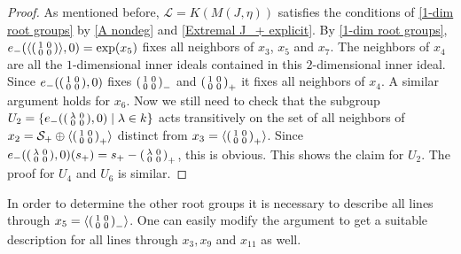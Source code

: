 \documentclass[oneside,a4paper]{amsart} %
\theoremstyle{definition}
\numberwithin{equation}{section}
\begin{document}
\begin{proof}
	As mentioned before, $\mathcal L=K(M(J,\eta))$ satisfies the conditions of \cref{1-dim root groups} by \cref{A nondeg} and \cref{Extremal J_+ explicit}.
	By \cref{1-dim root groups}, $e_-( \langle \begin{psmallmatrix} 1&0\\0&0 \end{psmallmatrix}\rangle,0)=\exp(x_5)$ fixes all neighbors of $x_3$, $x_5$ and $x_7$.
	The neighbors of $x_4$ are all the $1$-dimensional inner ideals contained in this $2$-dimensional inner ideal. 
	Since $e_-( \begin{psmallmatrix} 1&0\\0&0 \end{psmallmatrix},0)$ fixes $\begin{psmallmatrix} 1&0\\0&0 \end{psmallmatrix}_-$ and $\begin{psmallmatrix} 1&0\\0&0 \end{psmallmatrix}_+$ it fixes all neighbors of $x_4$. 
	A similar argument holds for $x_6$.
	Now we still need to check that the subgroup $U_2=\{e_-(\begin{psmallmatrix} \lambda&0\\0&0 \end{psmallmatrix},0)\mid \lambda \in k\}$ acts transitively on the set of all neighbors of $x_2=\mathcal S_+\oplus \langle \begin{psmallmatrix} 1&0\\0&0 \end{psmallmatrix}_+\rangle $ distinct from $x_3=\langle \begin{psmallmatrix} 1&0\\0&0 \end{psmallmatrix}_+\rangle $.
	Since $e_-(\begin{psmallmatrix} \lambda&0\\0&0 \end{psmallmatrix},0)(s_+)=s_+-\begin{psmallmatrix} \lambda&0\\0&0 \end{psmallmatrix}_+
	$, this is obvious.
	This shows the claim for $U_2$.
	The proof for $U_4$ and $U_6$ is similar.
\end{proof}

In order to determine the other root groups it is necessary to describe all lines through $x_5=\langle \begin{psmallmatrix} 1&0\\0&0 \end{psmallmatrix}_- \rangle$.
One can easily modify the argument to get a suitable description for all lines through $x_3, x_9$ and $x_{11}$ as well.
\end{document}
